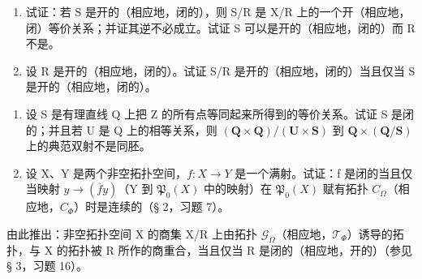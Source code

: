 \begin{enumerate}
\def\labelenumi{\alph{enumi})}
\tightlist
\item
  试证：若 S 是开的（相应地，闭的），则 S/R 是 X/R 上的一个开（相应地，闭）等价关系；并证其逆不必成立。试证 S 可以是开的（相应地，闭的）而 R 不是。
\item
  设 R 是开的（相应地，闭的）。试证 S/R 是开的（相应地，闭的）当且仅当 S 是开的（相应地，闭的）。
\end{enumerate}

\begin{enumerate}
\def\labelenumi{\arabic{enumi})}
\setcounter{enumi}{5}
\item
  设 S 是有理直线 Q 上把 Z 的所有点等同起来所得到的等价关系。试证 S 是闭的；并且若 U 是 Q 上的相等关系，则 \((\mathbf{Q} \times \mathbf{Q}) / (\mathbf{U} \times \mathbf{S})\) 到 \(\mathbf{Q} \times (\mathbf{Q}/\mathbf{S})\) 上的典范双射不是同胚。
\item
  设 X、Y 是两个非空拓扑空间，\(f: X \to Y\) 是一个满射。试证：f 是闭的当且仅当映射 \(y \to (\overline{f} y)\)（Y 到 \(\mathfrak{P}_{0}(X)\) 中的映射）在 \(\mathfrak{P}_{0}(X)\) 赋有拓扑 \(C_{\Omega}\)（相应地，\(C_{\Phi}\)）时是连续的（§ 2，习题 7）。
\end{enumerate}

由此推出：非空拓扑空间 X 的商集 X/R 上由拓扑 \(\mathcal{G}_{\Omega}\)（相应地，\(\mathcal{T}_{\Phi}\)）诱导的拓扑，与 X 的拓扑被 R 所作的商重合，当且仅当 R 是闭的（相应地，开的）（参见 § 3，习题 16）。

